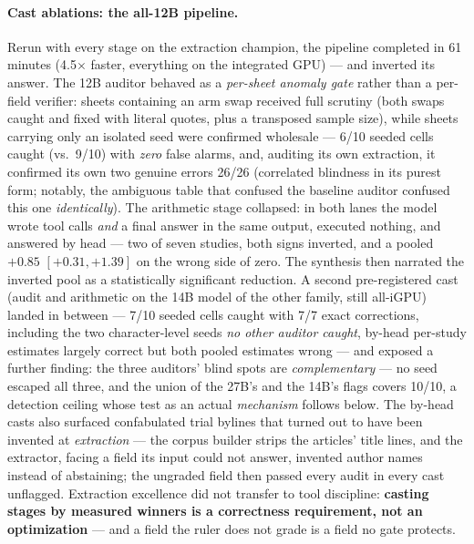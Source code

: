 \paragraph{Cast ablations: the all-12B pipeline.} Rerun with every stage on the extraction champion, the pipeline completed in 61 minutes (4.5$\times$ faster, everything on the integrated GPU) --- and inverted its answer. The 12B auditor behaved as a \emph{per-sheet anomaly gate} rather than a per-field verifier: sheets containing an arm swap received full scrutiny (both swaps caught and fixed with literal quotes, plus a transposed sample size), while sheets carrying only an isolated seed were confirmed wholesale --- 6/10 seeded cells caught (vs.\ 9/10) with \emph{zero} false alarms, and, auditing its own extraction, it confirmed its own two genuine errors 26/26 (correlated blindness in its purest form; notably, the ambiguous table that confused the baseline auditor confused this one \emph{identically}). The arithmetic stage collapsed: in both lanes the model wrote tool calls \emph{and} a final answer in the same output, executed nothing, and answered by head --- two of seven studies, both signs inverted, and a pooled $+0.85$ $[+0.31, +1.39]$ on the wrong side of zero. The synthesis then narrated the inverted pool as a statistically significant reduction. A second pre-registered cast (audit and arithmetic on the 14B model of the other family, still all-iGPU) landed in between --- 7/10 seeded cells caught with 7/7 exact corrections, including the two character-level seeds \emph{no other auditor caught}, by-head per-study estimates largely correct but both pooled estimates wrong --- and exposed a further finding: the three auditors' blind spots are \emph{complementary} --- no seed escaped all three, and the union of the 27B's and the 14B's flags covers 10/10, a detection ceiling whose test as an actual \emph{mechanism} follows below. The by-head casts also surfaced confabulated trial bylines that turned out to have been invented at \emph{extraction} --- the corpus builder strips the articles' title lines, and the extractor, facing a field its input could not answer, invented author names instead of abstaining; the ungraded field then passed every audit in every cast unflagged. Extraction excellence did not transfer to tool discipline: \textbf{casting stages by measured winners is a correctness requirement, not an optimization} --- and a field the ruler does not grade is a field no gate protects.


